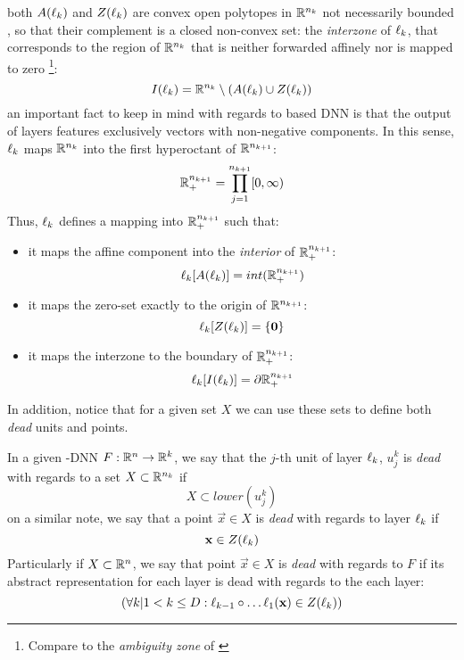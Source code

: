 both $A(\ell_k)$ and $Z(\ell_k)$ are convex open polytopes in $\mathbb{R}^{n_k}$ not necessarily bounded \cite{florenzano2001ConvexAnalysis,reyRiera2019ModellingClassificationReLU}, so that their complement is a closed non-convex set: the \emph{interzone} of $\ell_k$, that corresponds to the region of $\mathbb{R}^{n_k}$ that is neither forwarded affinely nor is mapped to zero \footnote{Compare to the \emph{ambiguity zone} of \cite{reyRiera2019ModellingClassificationReLU}}:
\begin{equation}\label{eq:interzone}
    I(\ell_k) = \mathbb{R}^{n_k}\setminus(A(\ell_k)\cup Z(\ell_k))
\end{equation}
an important fact to keep in mind with regards to \ReLU based DNN is that the output of layers features exclusively vectors with non-negative components. In this sense, $\ell_k$ maps $\mathbb{R}^{n_k}$ into the first hyperoctant of $\mathbb{R}^{n_{k+1}}$:  
\begin{equation}
    \mathbb{R}^{n_{k+1}}_{+}=\displaystyle\prod_{j=1}^{n_{k+1}}[0,\infty)
\end{equation}
Thus, $\ell_k$ defines a mapping into $\mathbb{R}^{n_{k+1}}_{+}$ such that: 
\begin{itemize}
    \item it maps the affine component into the \emph{interior} of $\mathbb{R}^{n_{k+1}}_{+}$: $$\ell_k[A(\ell_k)] = int(\mathbb{R}^{n_{k+1}}_{+})$$
    \item it maps the zero-set exactly to the origin of $\mathbb{R}^{n_{k+1}}$:$$\ell_k[Z(\ell_k)] = \{\mathbf{0}\}$$
    \item it maps the interzone to the boundary of $\mathbb{R}^{n_{k+1}}_{+}$: $$\ell_k[I(\ell_k)] = \partial\mathbb{R}^{n_{k+1}}_{+}$$
\end{itemize}
In addition, notice that for a given set $X$ we can use these sets to define both \emph{dead} units and points. 
\begin{remark}
In a given \ReLU-DNN $F:\mathbb{R}^{n}\rightarrow\mathbb{R}^{k}$, we say that the $j$-th unit of layer $\ell_k$, $u_j^k$ is \emph{dead} with regards to a set $X\subset\mathbb{R}^{n_k}$ if 
\begin{equation}\label{eq:defDeadUnit}
X\subset lower(u_j^k)
\end{equation}
on a similar note, we say that a point $\vec{x}\in X$ is \emph{dead} with regards to layer $\ell_k$ if 
\begin{equation}
    \mathbf{x}\in Z(\ell_k)
\end{equation}
Particularly if $X\subset\mathbb{R}^{n}$, we say that point $\vec{x}\in X$ is \emph{dead} with regards to $F$ if its abstract representation for each layer is dead with regards to the each layer:
\begin{equation}
    (\forall k| 1 < k \leq D: \ell_{k-1}\circ\ldots\ell_1(\mathbf{x})\in Z(\ell_k))
\end{equation}
\end{remark}
